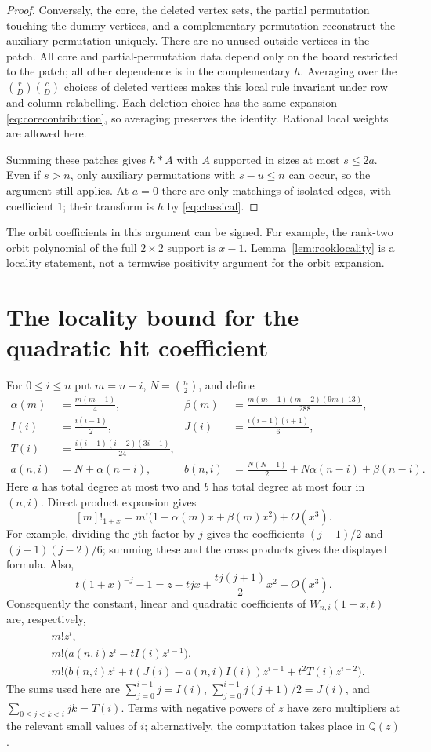 \documentclass[11pt]{article}
\newcommand{\QQ}{\mathbb Q}
\begin{document}
\begin{proof}
Conversely, the core, the deleted vertex sets, the partial permutation
touching the dummy vertices, and a complementary permutation reconstruct
the auxiliary permutation uniquely. There are no unused outside
vertices in the patch. All core and partial-permutation data depend
only on the board restricted to the patch; all other dependence is in
the complementary $h$. Averaging over the
$\binom rD\binom cD$ choices of deleted vertices makes this local rule
invariant under row and column relabelling. Each deletion choice has
the same expansion \eqref{eq:corecontribution}, so averaging preserves
the identity. Rational local weights are allowed here.

Summing these patches gives $h*A$ with $A$ supported in sizes at most
$s\leq2a$. Even if $s>n$, only auxiliary permutations with
$s-u\leq n$ can occur, so the argument still applies. At $a=0$ there
are only matchings of isolated edges, with coefficient $1$; their
transform is $h$ by \eqref{eq:classical}.
\end{proof}

The orbit coefficients in this argument can be signed. For example,
the rank-two orbit polynomial of the full $2\times2$ support is $x-1$.
Lemma~\ref{lem:rooklocality} is a locality statement, not a termwise
positivity argument for the orbit expansion.

\section{The locality bound for the quadratic hit coefficient}

For $0\leq i\leq n$ put $m=n-i$, $N=\binom n2$, and define
\begin{align*}
 \alpha(m)&=\frac{m(m-1)}4,&
 \beta(m)&=\frac{m(m-1)(m-2)(9m+13)}{288},\\
 I(i)&=\frac{i(i-1)}2,&
 J(i)&=\frac{i(i-1)(i+1)}6,\\
 T(i)&=\frac{i(i-1)(i-2)(3i-1)}{24},&&\\[-2pt]
 a(n,i)&=N+\alpha(n-i),&
 b(n,i)&=\frac{N(N-1)}2+N\alpha(n-i)+\beta(n-i).
\end{align*}
Here $a$ has total degree at most two and $b$ has total degree at most
four in $(n,i)$. Direct product expansion gives
\[
 [m]!_{1+x}=m!\bigl(1+\alpha(m)x+\beta(m)x^2\bigr)+O(x^3).
\]
For example, dividing the $j$th factor by $j$ gives the coefficients
$(j-1)/2$ and $(j-1)(j-2)/6$; summing these and the cross products
gives the displayed formula. Also,
\[
 t(1+x)^{-j}-1=z-tjx+\frac{tj(j+1)}2x^2+O(x^3).
\]
Consequently the constant, linear and quadratic coefficients of
$W_{n,i}(1+x,t)$ are, respectively,
\begin{align}
 &m!z^i,\nonumber\\
 &m!\bigl(a(n,i)z^i-tI(i)z^{i-1}\bigr),\label{eq:weights}\\
 &m!\bigl(b(n,i)z^i+t(J(i)-a(n,i)I(i))z^{i-1}
                       +t^2T(i)z^{i-2}\bigr).\nonumber
\end{align}
The sums used here are
$\sum_{j=0}^{i-1}j=I(i)$,
$\sum_{j=0}^{i-1}j(j+1)/2=J(i)$, and
$\sum_{0\leq j<k<i}jk=T(i)$.
Terms with negative powers of $z$ have zero multipliers at the relevant
small values of $i$; alternatively, the computation takes place in
$\QQ(z)$.
\end{document}
